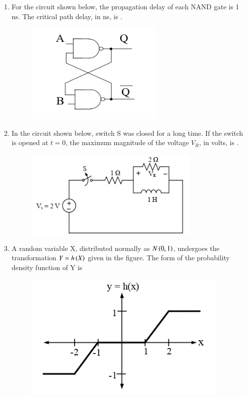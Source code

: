 \documentclass[a4paper, 11pt]{article}
\begin{document}
\begin{enumerate}
    \item For the circuit shown below, the propagation delay of each NAND gate is 1 ns. The critical path delay, in ns, is \underline{\hspace{2cm}} .
    \begin{figure}[H]
        \centering
        \includegraphics[width=0.6\columnwidth]{figs/Q24.png}
        \caption*{}
        \label{fig:q34}
    \end{figure}
    
    \hfill{}
    
    \item In the circuit shown below, switch S was closed for a long time. If the switch is opened at $t=0$, the maximum magnitude of the voltage $V_R$, in volts, is \underline{\hspace{2cm}} .
    \begin{figure}[H]
        \centering
        \includegraphics[width=0.4\columnwidth]{figs/Q25.png}
        \caption*{}
        \label{fig:q35}
    \end{figure}
    
    \hfill{}
    
    \item A random variable X, distributed normally as $N\left(0,1\right)$, undergoes the transformation $Y=h\left(X\right)$ given in the figure. The form of the probability density function of Y is 
    \begin{figure}[H]
        \centering
        \includegraphics[width=0.4\columnwidth]{figs/Q26.png}
        \caption*{}
        \label{fig:q36}
    \end{figure}
    

\end{enumerate}
\end{document}
